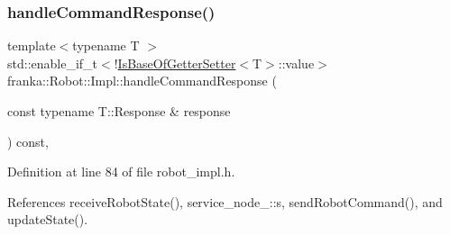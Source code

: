 \subsubsection{\texorpdfstring{handle\+Command\+Response()}{handleCommandResponse()}\hspace{0.1cm}{\footnotesize\ttfamily [2/2]}}
{\footnotesize\ttfamily template$<$typename T $>$ \\
std\+::enable\+\_\+if\+\_\+t$<$!\hyperlink{classfranka_1_1Robot_1_1Impl_a42d57d169b53c906439dbbde255c1bae}{Is\+Base\+Of\+Getter\+Setter}$<$T$>$\+::value$>$ franka\+::\+Robot\+::\+Impl\+::handle\+Command\+Response (\begin{DoxyParamCaption}\item[{const typename T\+::\+Response \&}]{response }\end{DoxyParamCaption}) const\hspace{0.3cm}{\ttfamily [inline]}, {\ttfamily [private]}}



Definition at line 84 of file robot\+\_\+impl.\+h.



References receive\+Robot\+State(), service\+\_\+node\+\_\+::s, send\+Robot\+Command(), and update\+State().


